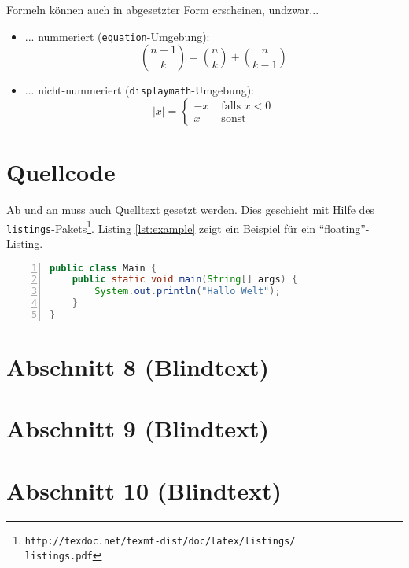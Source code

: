 \documentclass[ngerman]{ewks-latex}
\begin{document}
Formeln können auch in abgesetzter Form erscheinen, undzwar...
\begin{itemize}
\item ... nummeriert (\texttt{equation}-Umgebung):
\begin{equation}
{n+1\choose k} = {n\choose k} + {n \choose k-1}
\end{equation}

\item ... nicht-nummeriert (\texttt{displaymath}-Umgebung):
\begin{displaymath}
|x| = \left\{ \begin{array}{rl}
 -x &\mbox{ falls $x<0$} \\
  x &\mbox{ sonst}
       \end{array} \right.
\end{displaymath}
\end{itemize} 



\section{Quellcode}
Ab und an muss auch Quelltext gesetzt werden. Dies geschieht mit Hilfe des \texttt{listings}-Pakets\footnote{\texttt{http://texdoc.net/texmf-dist/doc/latex/listings/\\listings.pdf}}. Listing \ref{lst:example} zeigt ein Beispiel für ein "`floating"'-Listing.

\begin{lstlisting}[float, caption=Beispiel eines Java-Listings, label=lst:example, language=java, basicstyle=\small, tabsize=4, showstringspaces=false, numbers=left, frame=single, keywordstyle=\bfseries]
public class Main {
	public static void main(String[] args) {
		System.out.println("Hallo Welt");
	}
}
\end{lstlisting}

\section{Abschnitt 8 (Blindtext)}
\lipsum[5-10]

\section{Abschnitt 9 (Blindtext)}
\lipsum[11-20]

\section{Abschnitt 10 (Blindtext)}
\lipsum[21-30]
\end{document}
